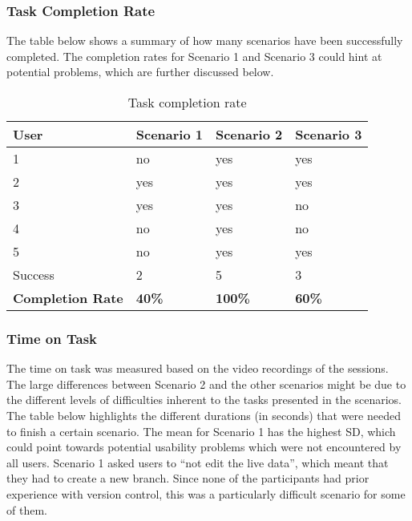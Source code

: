 \subsubsection{Task Completion Rate}
The table below shows a summary of how many scenarios have been successfully completed. The completion rates for Scenario 1 and Scenario 3 could hint at potential problems, which are further discussed below.

\begin{table}[h!]
\begin{tabular}{|l|l|l|l|}
\hline
\rowcolor[HTML]{EFEFEF}
{\bf User}                     & {\bf Scenario 1} & {\bf Scenario 2} & {\bf Scenario 3} \\ \hline
1                              & no           & yes          & yes          \\ \hline
2                              & yes          & yes          & yes          \\ \hline
3                              & yes          & yes          & no           \\ \hline
4                              & no           & yes          & no      \\ \hline
5                              & no      & yes          & yes          \\ \hline
\rowcolor[HTML]{EFEFEF}
Success & 2 & 5 & 3 \\ \hline
\rowcolor[HTML]{EFEFEF}
{\bf Completion Rate} & {\bf 40\%}   & {\bf 100\%}  & {\bf 60\%}   \\ \hline
\end{tabular}
\centering
\caption{Task completion rate}
\label{table:task-completion-rate}
\end{table}

\subsubsection{Time on Task}
The time on task was measured based on the video recordings of the sessions. The large differences between Scenario 2 and the other scenarios might be due to the different levels of difficulties inherent to the tasks presented in the scenarios. The table below highlights the different durations (in seconds) that were needed to finish a certain scenario. The mean for Scenario 1 has the highest \ac{SD}, which could point towards potential usability problems which were not encountered by all users. Scenario 1 asked users to “not edit the live data”, which meant that they had to create a new branch. Since none of the participants had prior experience with version control, this was a particularly difficult scenario for some of them.

